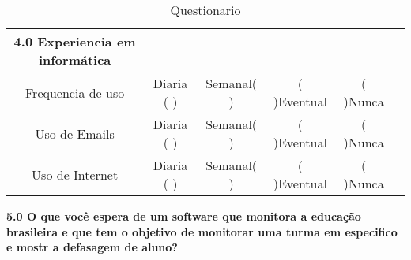 \begin{itemize}
		\begin{table}
		\centering
		\begin{tabular}{|c|c|c|c|c|c|} 

		\hline
			\textbf{4.0 Experiencia em informática}\\ 
		\hline
		   Frequencia de uso & Diaria ( ) & Semanal( ) & ( )Eventual & ( )Nunca &  \\
		\hline
		   Uso de Emails & Diaria ( ) & Semanal( ) & ( )Eventual & ( )Nunca &  \\
		\hline
			Uso de Internet& Diaria ( ) & Semanal( ) & ( )Eventual & ( )Nunca & \\
		\hline
		\end{tabular}
		\caption{Questionario}

		\end{table}


		\textbf{5.0 O que você espera de um software que monitora a educação brasileira e que tem o objetivo de monitorar uma turma em especifico e mostr a defasagem de aluno?}

\end{itemize}